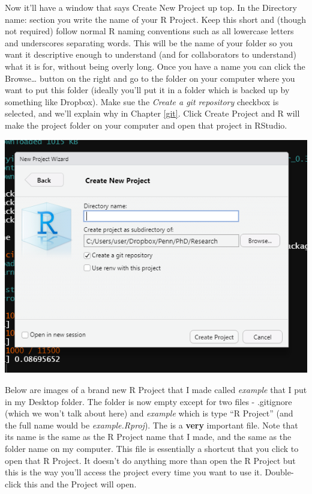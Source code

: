 \documentclass[
  12pt,
]{book}
\begin{document}
Now it'll have a window that says Create New Project up top. In the Directory name: section you write the name of your R Project. Keep this short and (though not required) follow normal R naming conventions such as all lowercase letters and underscores separating words. This will be the name of your folder so you want it descriptive enough to understand (and for collaborators to understand) what it is for, without being overly long. Once you have a name you can click the Browse\ldots{} button on the right and go to the folder on your computer where you want to put this folder (ideally you'll put it in a folder which is backed up by something like Dropbox). Make sue the \emph{Create a git repository} checkbox is selected, and we'll explain why in Chapter \ref{git}. Click Create Project and R will make the project folder on your computer and open that project in RStudio.

\includegraphics{images/new_project_4.PNG}

Below are images of a brand new R Project that I made called \emph{example} that I put in my Desktop folder. The folder is now empty except for two files - .gitignore (which we won't talk about here) and \emph{example} which is type ``R Project'' (and the full name would be \emph{example.Rproj}). The is a \textbf{very} important file. Note that its name is the same as the R Project name that I made, and the same as the folder name on my computer. This file is essentially a shortcut that you click to open that R Project. It doesn't do anything more than open the R Project but this is the way you'll access the project every time you want to use it. Double-click this and the Project will open.
\end{document}
